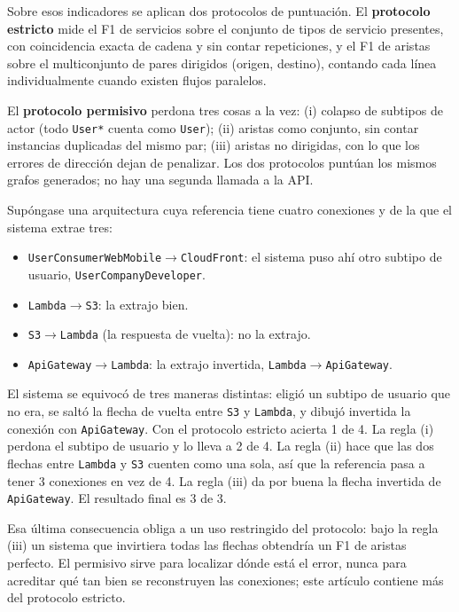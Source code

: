 \documentclass[a4paper, twocolumn, 10pt]{IEEEtran}
\begin{document}
Sobre esos indicadores se aplican dos protocolos de puntuación. El \textbf{protocolo estricto} mide el F1 de servicios sobre el conjunto de tipos de servicio presentes, con coincidencia exacta de cadena y sin contar repeticiones, y el F1 de aristas sobre el multiconjunto de pares dirigidos (origen, destino), contando cada línea individualmente cuando existen flujos paralelos.
 
El \textbf{protocolo permisivo} perdona tres cosas a la vez: (i) colapso de subtipos de actor (todo \texttt{User*} cuenta como \texttt{User}); (ii) aristas como conjunto, sin contar instancias duplicadas del mismo par; (iii) aristas no dirigidas, con lo que los errores de dirección dejan de penalizar. Los dos protocolos puntúan los mismos grafos generados; no hay una segunda llamada a la API.
 
 
Supóngase una arquitectura cuya referencia tiene cuatro conexiones y de la que el sistema extrae tres: 
 
\begin{itemize}\itemsep2pt
\item \texttt{UserConsumerWebMobile}$\rightarrow$\texttt{CloudFront}: el sistema
puso ahí otro subtipo de usuario, \texttt{UserCompanyDeveloper}.
\item \texttt{Lambda}$\rightarrow$\texttt{S3}: la extrajo bien.
\item \texttt{S3}$\rightarrow$\texttt{Lambda} (la respuesta de vuelta): no la
extrajo.
\item \texttt{ApiGateway}$\rightarrow$\texttt{Lambda}: la extrajo invertida,
\texttt{Lambda}$\rightarrow$\texttt{ApiGateway}.
\end{itemize}
 
 
El sistema se equivocó de tres maneras distintas: eligió un subtipo de usuario que no era, se saltó la flecha de vuelta entre \texttt{S3} y \texttt{Lambda}, y dibujó invertida la conexión con \texttt{ApiGateway}. Con el protocolo estricto acierta 1 de 4. La regla (i) perdona el subtipo de usuario y lo lleva a 2 de 4. La regla (ii) hace que las dos flechas entre \texttt{Lambda} y \texttt{S3} cuenten como una sola, así que la referencia pasa a tener 3 conexiones en vez de 4. La regla (iii) da por buena la flecha invertida de \texttt{ApiGateway}. El resultado final es 3 de 3.
 
Esa última consecuencia obliga a un uso restringido del protocolo: bajo la regla (iii) un sistema que invirtiera todas las flechas obtendría un F1 de aristas perfecto. El permisivo sirve para localizar dónde está el error, nunca para acreditar qué tan bien se reconstruyen las conexiones; este artículo contiene más del protocolo estricto.
 
\end{document}
